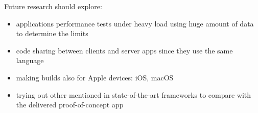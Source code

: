 Future research should explore:
\begin{itemize}
    \item applications performance tests under heavy load using huge amount of data to determine the limits
    \item code sharing between clients and server apps since they use the same language
    \item making builds also for Apple devices: iOS, macOS
    \item trying out other mentioned in state-of-the-art frameworks to compare with the delivered proof-of-concept app
\end{itemize}



